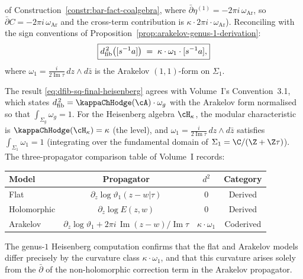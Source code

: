 \begin{computation}
of Construction~\ref{constr:bar-fact-coalgebra}, where
$\bar\partial \eta^{(1)} = -2\pi i\, \omega_{\mathrm{Ar}}$, so
$\bar\partial C = -2\pi i\, \omega_{\mathrm{Ar}}$ and the
cross-term contribution is
$\kappa \cdot 2\pi i \cdot \omega_{\mathrm{Ar}}$).
Reconciling with the sign conventions of
Proposition~\ref{prop:arakelov-genus-1-derivation}:
\begin{equation}\label{eq:dfib-sq-final-heisenberg}
 \boxed{
 d_{\mathrm{fib}}^{\,2}\bigl([s^{-1}a]\bigr)
 \;=\;
 \kappa \cdot \omega_1 \cdot [s^{-1}a],
 }
\end{equation}
where $\omega_1 = \frac{i}{2\operatorname{Im}\tau}\,
dz \wedge d\bar z$ is the Arakelov $(1,1)$-form on $\Sigma_1$.
\end{computation}

\begin{remark}
\label{rem:consistency-vol-I-convention}
The result \eqref{eq:dfib-sq-final-heisenberg} agrees with
Volume~I's Convention~3.1, which states
$\dfib^{\,2} = \kappaChHodge(\cA) \cdot \omega_g$ with the Arakelov form
normalised so that $\int_{\Sigma_g}\omega_g = 1$. For the
Heisenberg algebra $\cH_\kappa$, the modular characteristic is
$\kappaChHodge(\cH_\kappa) = \kappa$ (the level), and
$\omega_1 = \frac{i}{2\operatorname{Im}\tau}\,dz \wedge d\bar z$
satisfies $\int_{\Sigma_1}\omega_1 = 1$ (integrating over the
fundamental domain of $\Sigma_1 = \C/(\Z + \Z\tau)$).
The three-propagator comparison table of Volume~I records:
\begin{center}
\renewcommand{\arraystretch}{1.3}
\begin{tabular}{lccc}
\textbf{Model} & \textbf{Propagator} & $d^2$ &
 \textbf{Category} \\
\hline
Flat & $\partial_z\log\vartheta_1(z-w|\tau)$ & $0$ &
 Derived \\
Holomorphic & $\partial_z\log E(z,w)$ & $0$ &
 Derived \\
Arakelov &
 $\partial_z\log\vartheta_1 + 2\pi i\,\operatorname{Im}(z-w)/\operatorname{Im}\tau$
 & $\kappa \cdot \omega_1$ &
 Coderived
\end{tabular}
\end{center}
The genus-$1$ Heisenberg computation confirms that the flat and
Arakelov models differ precisely by the curvature class
$\kappa \cdot \omega_1$, and that this curvature arises solely
from the $\bar\partial$ of the non-holomorphic correction term in the
Arakelov propagator.
\end{remark}


